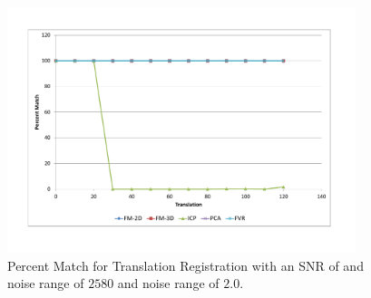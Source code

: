\begin{figure}[!htb]
\centering
\includegraphics[width=4.0in]{images/results/noise/TransNoise2}
\caption{Percent Match for Translation Registration with an SNR of and noise range of $2580$ and noise range of $2.0$.}
\label{fig:TNoise2}
\end{figure}